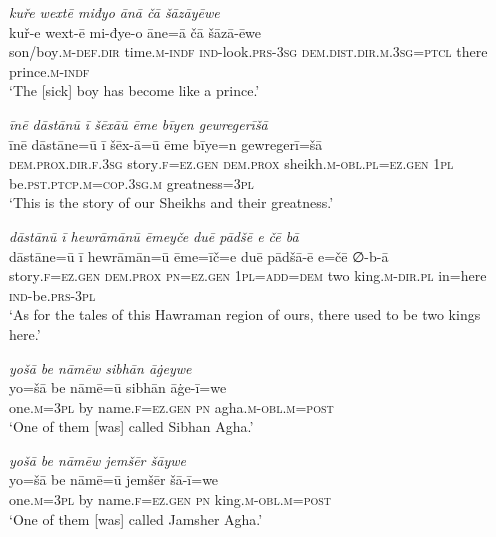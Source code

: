 \ea \label{DG.70}
\textit{kuře wextē miđyo ānā čā šāzāyēwe} \\ 
\gll kuř-e wext-ē mi-đye-o āne=ā čā šāzā-ēwe \\ 
 son/boy\textsc{.m}\textsc{-def}\textsc{.dir} time\textsc{.m}\textsc{-indf} \textsc{ind-}look\textsc{.prs}\textsc{-3sg} \textsc{dem.dist}\textsc{.dir}\textsc{.m}\textsc{.3sg}=\textsc{ptcl} there prince\textsc{.m}\textsc{-indf} \\ 
\glt `The [sick] boy has become like a prince.'
\z 
 
\ea \label{DG.73}
\textit{īnē dāstānū ī šēxāū ēme bīyen gewregerīšā} \\ 
\gll īnē dāstāne=ū ī šēx-ā=ū ēme bīye=n gewregerī=šā \\ 
 \textsc{dem.prox}\textsc{.dir}\textsc{\textsc{.f}}\textsc{.3sg} story\textsc{\textsc{.f}}\textsc{=ez}\textsc{.gen} \textsc{dem.prox} sheikh\textsc{.m}\textsc{-obl}\textsc{.pl}=\textsc{ez.gen} \textsc{1pl} be\textsc{.pst}\textsc{.ptcp}\textsc{.m}\textsc{=cop}\textsc{.3sg}\textsc{.m} greatness\textsc{=3pl} \\ 
\glt `This is the story of our Sheikhs and their greatness.'
\z 
 

\ea \label{DP.1}
\textit{dāstānū ī hewrāmānū ēmeyče duē pādšē e čē bā} \\ 
\gll dāstāne=ū ī hewrāmān=ū ēme=īč=e duē pādšā-ē e=čē ∅-b-ā \\ 
 story\textsc{\textsc{.f}}\textsc{=ez}\textsc{.gen} \textsc{dem.prox} \textsc{pn}\textsc{=ez}\textsc{.gen} \textsc{1pl}\textsc{=add}\textsc{=dem} two king\textsc{.m}\textsc{-dir}\textsc{.pl} in=here \textsc{ind-}be\textsc{.prs}\textsc{-3pl} \\ 
\glt `As for the tales of this Hawraman region of ours, there used to be two kings here.'
\z 
 
\ea \label{DP.2}
\textit{yošā be nāmēw sibhān āġeywe} \\ 
\gll yo=šā be nāmē=ū sibhān āġe-ī=we \\ 
 one\textsc{.m}\textsc{=3pl} by name\textsc{\textsc{.f}}\textsc{=ez}\textsc{.gen} \textsc{pn} agha\textsc{.m}\textsc{-obl}\textsc{.m}\textsc{=\textsc{post}} \\ 
\glt `One of them [was] called Sibhan Agha.'
\z 
 
\ea \label{DP.3}
\textit{yošā be nāmēw jemšēr šāywe} \\ 
\gll yo=šā be nāmē=ū jemšēr šā-ī=we \\ 
 one\textsc{.m}\textsc{=3pl} by name\textsc{\textsc{.f}}\textsc{=ez}\textsc{.gen} \textsc{pn} king\textsc{.m}\textsc{-obl}\textsc{.m}\textsc{=\textsc{post}} \\ 
\glt `One of them [was] called Jamsher Agha.'
\z 
 
